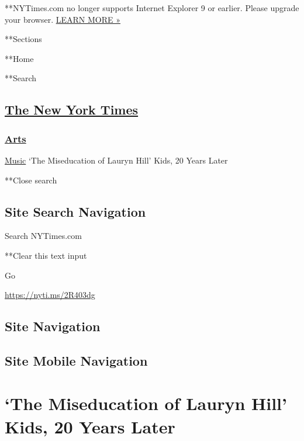  **NYTimes.com no longer supports Internet Explorer 9 or earlier. Please
upgrade your browser.
\href{http://www.nytimes3xbfgragh.onion/content/help/site/ie9-support.html}{LEARN
MORE »}

**Sections

**Home

**Search

\hypertarget{the-new-york-times}{%
\subsection{\texorpdfstring{\href{http://www.nytimes3xbfgragh.onion/}{The
New York Times}}{The New York Times}}\label{the-new-york-times}}

\hypertarget{-arts-}{%
\subsubsection{\texorpdfstring{
\href{https://www.nytimes3xbfgragh.onion/section/arts}{Arts}
}{ Arts }}\label{-arts-}}

 \href{https://www.nytimes3xbfgragh.onion/section/arts/music}{Music}
\textbar{}`The Miseducation of Lauryn Hill' Kids, 20 Years Later

**Close search

\hypertarget{site-search-navigation}{%
\subsection{Site Search Navigation}\label{site-search-navigation}}

Search NYTimes.com

**Clear this text input

Go

\url{https://nyti.ms/2R403dg}

\hypertarget{site-navigation}{%
\subsection{Site Navigation}\label{site-navigation}}

\hypertarget{site-mobile-navigation}{%
\subsection{Site Mobile Navigation}\label{site-mobile-navigation}}

\hypertarget{the-miseducation-of-lauryn-hill-kids-20-years-later}{%
\section{`The Miseducation of Lauryn Hill' Kids, 20 Years
Later}\label{the-miseducation-of-lauryn-hill-kids-20-years-later}}

